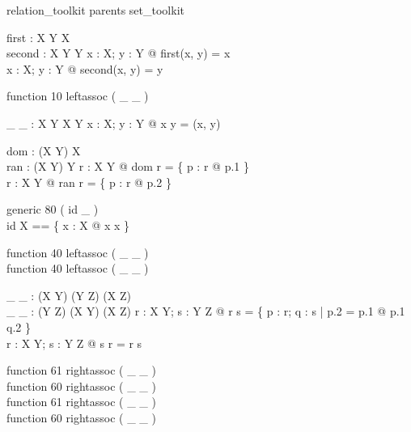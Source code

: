 \zsection relation\_toolkit parents set\_toolkit\\

\begin{gendef}[X, Y]
  first : X \cross Y \fun X\\
  second : X \cross Y \fun Y
\where
  \forall x : X; y : Y @ first(x, y) = x\\
  \forall x : X; y : Y @ second(x, y) = y
\end{gendef}

\begin{zed}
  function 10 leftassoc ( \_ \mapsto \_ )
\end{zed}

\begin{gendef}[X, Y]
  \_ \mapsto \_ : X \cross Y \fun X \cross Y
\where
  \forall x : X; y : Y @ x \mapsto y = (x, y)
\end{gendef}

\begin{gendef}[X, Y]
  dom : (X \rel Y) \fun \power X\\
  ran : (X \rel Y) \fun \power Y
\where
  \forall r : X \rel Y @ dom r = \{ p : r @ p.1 \}\\
  \forall r : X \rel Y @ ran r = \{ p : r @ p.2 \}
\end{gendef}

\begin{zed}
  generic 80 ( id \_ )\\
  id X == \{ x : X @ x \mapsto x \}
\end{zed}

\begin{zed}
  function 40 leftassoc ( \_ \comp \_ )\\
  function 40 leftassoc ( \_ \circ \_ )
\end{zed}

\begin{gendef}[X, Y, Z]
  \_ \comp \_ : (X \rel Y) \cross (Y \rel Z) \fun (X \rel Z)\\
  \_ \circ \_ : (Y \rel Z) \cross (X \rel Y) \fun (X \rel Z)
\where
  \forall r : X \rel Y; s : Y \rel Z @ r \comp s = 
      \{ p : r; q : s | p.2 = p.1 @ p.1 \mapsto q.2 \}\\
  \forall r : X \rel Y; s : Y \rel Z @ s \circ r = r \comp s
\end{gendef}

\begin{zed}
  function 61 rightassoc ( \_ \dres \_ )\\
  function 60 rightassoc ( \_ \rres \_ )\\
  function 61 rightassoc ( \_ \ndres \_ )\\
  function 60 rightassoc ( \_ \nrres \_ )
\end{zed}

